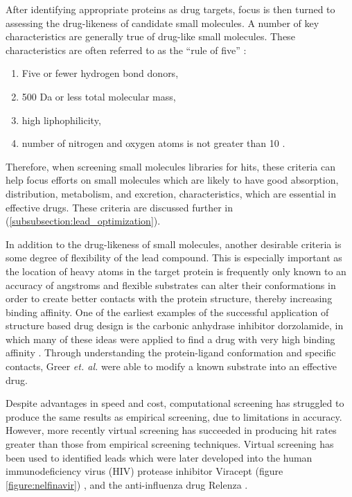 After identifying appropriate proteins as drug targets, focus is then turned to assessing the drug-likeness of candidate small molecules.
A number of key characteristics are generally true of drug-like small molecules.
These characteristics are often referred to as the ``rule of five'' \cite{lipinski2004lead,hopkins2002druggable}:
\begin{enumerate}
\item Five or fewer hydrogen bond donors,
\item 500 Da or less total molecular mass,
\item high liphophilicity,
\item number of nitrogen and oxygen atoms is not greater than 10 \cite{rule_of_five}.
\end{enumerate}
Therefore, when screening small molecules libraries for hits, these criteria can help focus efforts on small molecules which are likely to have good absorption, distribution, metabolism, and excretion, characteristics, which are essential in effective drugs.
These criteria are discussed further in  (\ref{subsubsection:lead_optimization}).

In addition to the drug-likeness of small molecules, another desirable criteria is some degree of flexibility of the lead compound.
This is especially important as the location of heavy atoms in the target protein is frequently only known to an accuracy of  angstroms and flexible substrates can alter their conformations in order to create better contacts with the protein structure, thereby increasing binding affinity.
One of the earliest examples of the successful application of structure based drug design is the carbonic anhydrase inhibitor dorzolamide, in which many of these ideas were applied to find a drug with very high binding affinity \cite{greer1994application}.
Through understanding the protein-ligand conformation and specific contacts, Greer {\it et. al.} were able to modify a known substrate into an effective drug. 


Despite advantages in speed and cost, computational screening has struggled to produce the same results as empirical screening, due to limitations in accuracy.
However, more recently virtual screening has succeeded in producing hit rates greater than those from empirical screening techniques.
Virtual screening has been used to identified leads which were later developed into the human immunodeficiency virus (HIV) protease inhibitor Viracept (figure \ref{figure:nelfinavir}) \cite{kaldor1997viracept}, and the anti-influenza drug Relenza \cite{von1993rational}.

